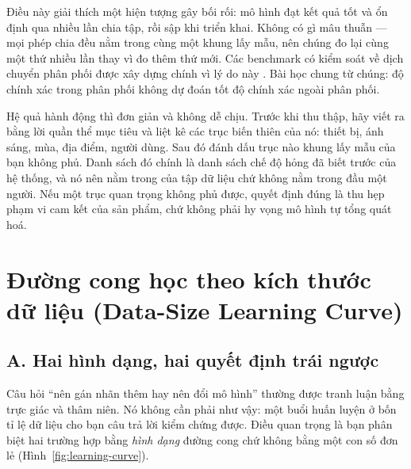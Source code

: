 \documentclass[../../deep_learning.tex]{subfiles}
\begin{document}
Điều này giải thích một hiện tượng gây bối rối: mô hình đạt kết quả tốt và ổn định qua nhiều lần chia tập, rồi sập khi triển khai. Không có gì mâu thuẫn --- mọi phép chia đều nằm trong cùng một khung lấy mẫu, nên chúng đo lại cùng một thứ nhiều lần thay vì đo thêm thứ mới. Các benchmark có kiểm soát về dịch chuyển phân phối được xây dựng chính vì lý do này \cite{recht2019imagenet,koh2021wilds}. Bài học chung từ chúng: độ chính xác trong phân phối không dự đoán tốt độ chính xác ngoài phân phối. 

Hệ quả hành động thì đơn giản và không dễ chịu. Trước khi thu thập, hãy viết ra bằng lời quần thể mục tiêu và liệt kê các trục biến thiên của nó: thiết bị, ánh sáng, mùa, địa điểm, người dùng. Sau đó đánh dấu trục nào khung lấy mẫu của bạn không phủ. Danh sách đó chính là danh sách chế độ hỏng đã biết trước của hệ thống, và nó nên nằm trong  của tập dữ liệu \cite{gebru2021datasheets} chứ không nằm trong đầu một người. Nếu một trục quan trọng không phủ được, quyết định đúng là thu hẹp phạm vi cam kết của sản phẩm, chứ không phải hy vọng mô hình tự tổng quát hoá.

\section{Đường cong học theo kích thước dữ liệu (Data-Size Learning Curve)}

\subsection{A. Hai hình dạng, hai quyết định trái ngược}
Câu hỏi ``nên gán nhãn thêm hay nên đổi mô hình'' thường được tranh luận bằng trực giác và thâm niên. Nó không cần phải như vậy: một buổi huấn luyện ở bốn tỉ lệ dữ liệu cho bạn câu trả lời kiểm chứng được. Điều quan trọng là bạn phân biệt hai trường hợp bằng \emph{hình dạng} đường cong chứ không bằng một con số đơn lẻ (Hình~\ref{fig:learning-curve}).
\end{document}
